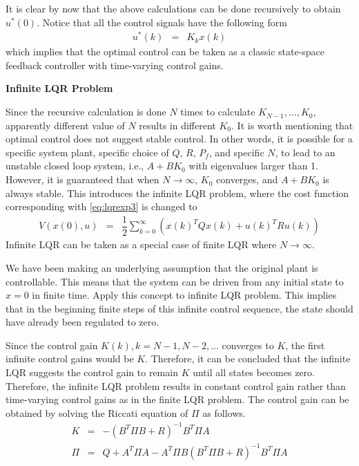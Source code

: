 It is clear by now that the above calculations can be done recursively to obtain $u^*(0)$. Notice that all the control signals have the following form
\begin{eqnarray}
  u^*(k) &=& K_{k}x(k) \nonumber
\end{eqnarray}
which implies that the optimal control can be taken as a classic state-space feedback controller with time-varying control gains.

\vspace{0.1in}
\noindent \textbf{Infinite LQR Problem}
\vspace{0.1in}

Since the recursive calculation is done $N$ times to calculate $K_{N-1},...,K_0$, apparently different value of $N$ results in different $K_0$. It is worth mentioning that optimal control does not suggest stable control. In other words, it is possible for a specific system plant, specific choice of $Q$, $R$, $P_f$, and specific $N$, to lead to an unstable closed loop system, i.e., $A+BK_0$ with eigenvalues larger than 1.
However, it is guaranteed that when $N\rightarrow \infty$, $K_0$ converges, and $A+BK_0$ is always stable. This introduces the infinite LQR problem, where the cost function corresponding with \eqref{eq:lqrexp3} is changed to
\begin{eqnarray}
  V\left(x(0), u\right) &=& \dfrac{1}{2}\sum_{k=0}^{\infty}\left(x(k)^TQx(k) + u(k)^TRu(k)\right) \nonumber
\end{eqnarray}
Infinite LQR can be taken as a special case of finite LQR where $N\rightarrow\infty$.

We have been making an underlying assumption that the original plant is controllable. This means that the system can be driven from any initial state to $x=0$ in finite time. Apply this concept to infinite LQR problem. This implies that in the beginning finite steps of this infinite control sequence, the state should have already been regulated to zero.

Since the control gain $K(k), k=N-1, N-2, ...$ converges to $K$, the first infinite control gains would be $K$. Therefore, it can be concluded that the infinite LQR suggests the control gain to remain $K$ until all states becomes zero. Therefore, the infinite LQR problem results in constant control gain rather than time-varying control gains as in the finite LQR problem. The control gain can be obtained by solving the Riccati equation of $\Pi$ as follows.
\begin{eqnarray}
  K &=& -(B^T\Pi B + R)^{-1}B^T\Pi A \nonumber \\
  \Pi &=& Q + A^T\Pi A-A^T\Pi B(B^T\Pi B+R)^{-1}B^T\Pi A \nonumber
\end{eqnarray}

